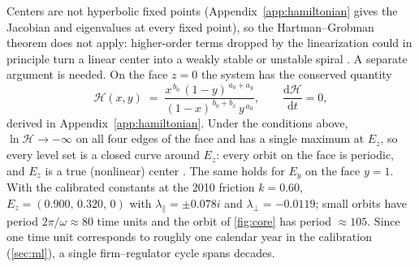 \documentclass[10pt]{article}
\begin{document}
Centers are not hyperbolic fixed points (Appendix~\ref{app:hamiltonian} gives the Jacobian and eigenvalues at every fixed point), so the Hartman--Grobman theorem does not apply: higher-order terms dropped by the linearization could in principle turn a linear center into a weakly stable or unstable spiral \cite{strogatz2024}. A separate argument is needed. On the face $z=0$ the system has the conserved quantity
\begin{equation}
\mathcal{H}(x,y) \;=\; \frac{x^{\,b_0}\,(1-y)^{\,a_0+a_y}}{(1-x)^{\,b_0+b_x}\,y^{\,a_0}},\qquad \frac{\mathrm{d}\mathcal{H}}{\mathrm{d}t}=0 ,
\label{eq:H}
\end{equation}
derived in Appendix~\ref{app:hamiltonian}. Under the conditions above, $\ln\mathcal{H}\to-\infty$ on all four edges of the face and has a single maximum at $E_z$, so every level set is a closed curve around $E_z$: every orbit on the face is periodic, and $E_z$ is a true (nonlinear) center \cite[Sec.~6.5]{strogatz2024}. The same holds for $E_y$ on the face $y=1$. With the calibrated constants at the 2010 friction $k=0.60$, $E_z=(0.900,\,0.320,\,0)$ with $\lambda_\parallel=\pm0.078i$ and $\lambda_\perp=-0.0119$; small orbits have period $2\pi/\omega\approx80$ time units and the orbit of \cref{fig:core} has period $\approx105$. Since one time unit corresponds to roughly one calendar year in the calibration (\cref{sec:ml}), a single firm--regulator cycle spans decades.
\end{document}
